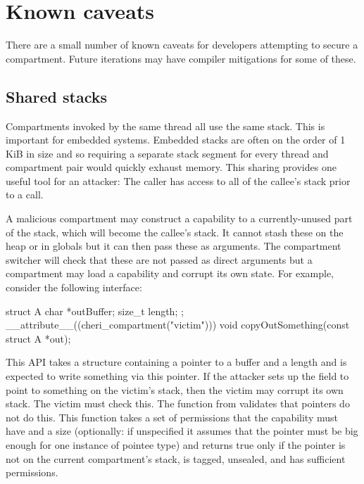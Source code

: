 \chapter{Known caveats}

There are a small number of known caveats for developers attempting to secure a compartment.
Future iterations may have compiler mitigations for some of these.

\section{Shared stacks}

Compartments invoked by the same thread all use the same stack.
This is important for embedded systems.
Embedded stacks are often on the order of 1 KiB in size and so requiring a separate stack segment for every thread and compartment pair would quickly exhaust memory.
This sharing provides one useful tool for an attacker: The caller has access to all of the callee's stack prior to a call.

A malicious compartment may construct a capability to a currently-unused part of the stack, which will become the callee's stack.
It cannot stash these on the heap or in globals but it can then pass these as arguments.
The compartment switcher will  check that these are not passed as direct arguments but a compartment may load a capability and corrupt its own state.
For example, consider the following interface:

\begin{ccodelisting}
struct A
{
	char *outBuffer;
	size_t length;
};
__attribute__((cheri_compartment("victim")))
void copyOutSomething(const struct A *out);
\end{ccodelisting}

This API takes a structure containing a pointer to a buffer and a length and is expected to write something via this pointer.
If the attacker sets up the  field to point to something on the victim's stack, then the victim may corrupt its own stack.
The victim must check this.
The  function from  validates that pointers do not do this.
This function takes a set of permissions that the capability must have and a size (optionally: if unspecified it assumes that the pointer must be big enough for one instance of pointee type) and returns true only if the pointer is not on the current compartment's stack, is tagged, unsealed, and has sufficient permissions.

